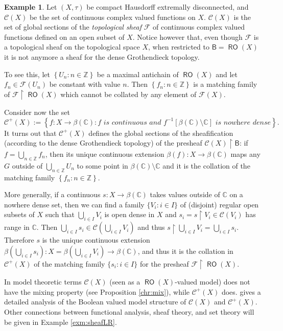 \documentclass[11pt]{amsart}
\newcommand{\C}{\mathcal{C}}
\newcommand{\F}{\mathcal{F}}
\theoremstyle{plain}
\theoremstyle{definition}
\newtheorem{example}[theorem]{Example}
\theoremstyle{plain}
\theoremstyle{remark}
\DeclareMathOperator{\RO}{\mathsf{RO}}
\newcommand{\bool}[1]{\mathsf{#1}}
\newcommand{\bp}[1]{\left\lbrace #1 \right\rbrace}
\newcommand{\0}{\mathsf{0}}
\renewcommand{\1}{\mathsf{1}}
\renewcommand{\2}{\mathsf{2}}
\theoremstyle{definition}
\begin{document}
\begin{example}\label{ex:sheaf}
 Let 
 $(X,\tau)$ be compact Hausdorff extremally disconnected,  and 
 $\C(X)$ be the set of continuous complex valued functions on $X$.
 $\C(X)$ is  the set of global sections of the \emph{topological sheaf} $\F$ of continuous complex valued functions defined on an open subset of $X$. 
 Notice however that, even though $\F$ is a topological sheaf on the topological space $X$, when restricted to $\bool{B}=\RO(X)$ it is not anymore a sheaf for the dense Grothendieck topology.
 
To see this, let $\bp{U_n:n\in\mathbb{Z}}$ be a maximal antichain of $\RO(X)$ and let $f_n\in \F(U_n)$ be constant with value $n$. Then $\bp{f_n:n\in\mathbb{Z}}$ is a matching family of $\F\restriction \RO(X)$
which cannot be collated by any element of $\F(X)$. 

 
 
 
Consider now the set 
\[
\C^+(X):=\bp{f:X\to\beta(\mathbb{C}): f \textit{ is continuous and }f^{-1}[\beta(\mathbb{C})\setminus\mathbb{C}]\textit{ is nowhere dense}}.
\] 
It turns out that $\C^+(X)$ defines the global sections of the sheafification (according to the dense Grothendieck topology) of the presheaf $\C(X)\restriction\bool{B}$:
if $f=\bigcup_{n\in\mathbb{Z}}f_n$, then its unique continuous extension
$\beta(f):X\to\beta(\mathbb{C})$ maps any $G$ outside of $\bigcup_{n\in\mathbb{Z}} U_n$ to some point in $\beta(\mathbb{C})\setminus\mathbb{C}$ and it is the collation of the matching family $\bp{f_n:n\in\mathbb{Z}}$.

More generally, if a continuous $s:X\to \beta(\mathbb{C})$ takes values outside of $\mathbb{C}$ on a nowhere dense set, then we can find a family
$\{V_i: i\in I\}$ of (disjoint) regular open subsets of $X$ such that $\bigcup_{i\in I}V_i$ is open dense in $X$ and $s_i=s\restriction V_i\in\C(V_i)$ has range in $\mathbb{C}$. Then $\bigcup_{i\in I}s_i\in\C(\bigcup_{i\in I}V_i)$ and thus $s\restriction\bigcup_{i\in I}V_i=\bigcup_{i\in I}s_i$. Therefore  $s$ is the unique continuous extension $\beta(\bigcup_{i\in I}s_i):X=\beta(\bigcup_{i\in I}V_i)\to\beta(\mathbb{C})$, and thus it is the collation in $\C^+(X)$ of the matching family $\{s_i: i\in I\}$ for the presheaf $\F\restriction \RO(X)$.

In model theoretic terms $\C(X)$ (seen as a $\RO(X)$-valued model) does not have the mixing property (see Proposition \ref{chr:mix}), while $\C^+(X)$ does. \cite{VIAVAC15} gives a detailed analysis of the Boolean valued model structure of $\C(X)$ and $\C^+(X)$.
Other connections between functional analysis, sheaf theory, and set theory will be given in Example \ref{exm:sheafLR}.
\end{example}
\end{document}

